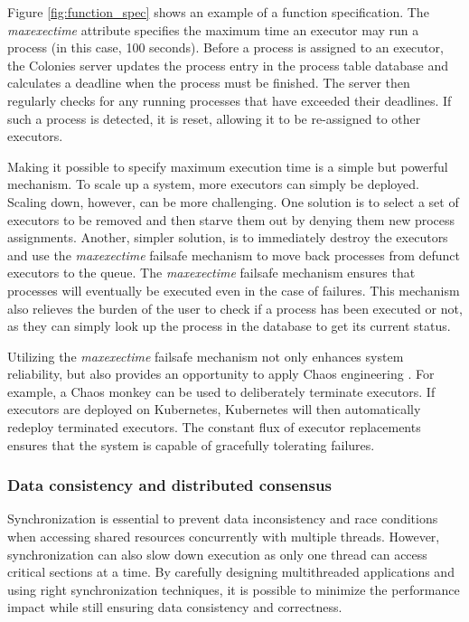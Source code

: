 \documentclass{article}
\begin{document}
Figure \ref{fig:function_spec} shows an example of a function specification. The \emph{maxexectime} attribute specifies the maximum time an executor may run a process (in this case, 100 seconds). Before a process is assigned to an executor, the Colonies server updates the process entry in the process table database and calculates a deadline when the process must be finished. The server then regularly checks for any running processes that have exceeded their deadlines. If such a process is detected, it is reset, allowing it to be re-assigned to other executors. 

Making it possible to specify maximum execution time is a simple but powerful mechanism. To scale up a system, more executors can simply be deployed. Scaling down, however, can be more challenging. One solution is to select a set of executors to be removed and then starve them out by denying them new process assignments. Another, simpler solution, is to immediately destroy the executors and use the \emph{maxexectime} failsafe mechanism to move back processes from defunct executors to the queue. The \emph{maxexectime} failsafe mechanism ensures that processes will eventually be executed even in the case of failures. This mechanism also relieves the burden of the user to check if a process has been executed or not, as they can simply look up the process in the database to get its current status. 

Utilizing the \emph{maxexectime} failsafe mechanism not only enhances system reliability, but also provides an opportunity to apply Chaos engineering \cite{chaos_engineering}. For example, a Chaos monkey can be used to deliberately terminate executors. If executors are deployed on Kubernetes, Kubernetes will then automatically redeploy terminated executors. The constant flux of executor replacements ensures that the system is capable of gracefully tolerating failures.

\subsubsection{Data consistency and distributed consensus}
Synchronization is essential to prevent data inconsistency and race conditions when accessing shared resources concurrently with multiple threads. However, synchronization can also slow down execution as only one thread can access critical sections at a time. By carefully designing multithreaded applications and using right synchronization techniques, it is possible to minimize the performance impact while still ensuring data consistency and correctness.  
\end{document}
